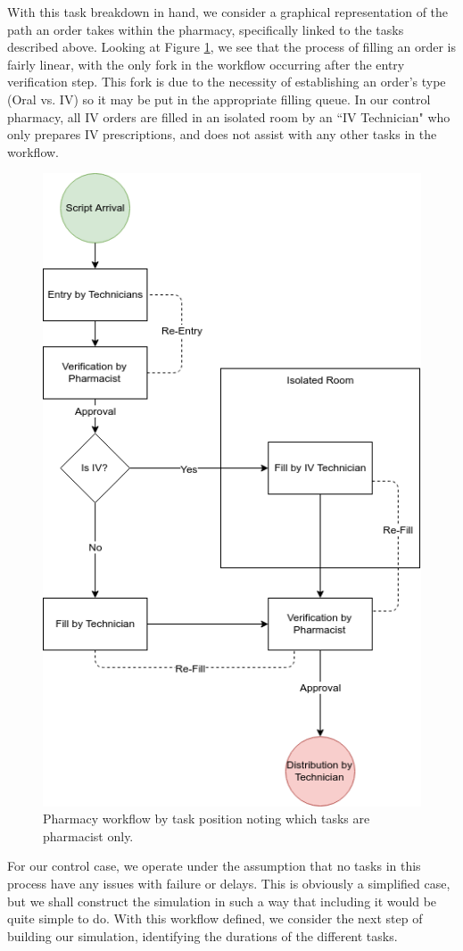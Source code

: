 \documentclass[10pt]{report}            %
\begin{document}
With this task breakdown in hand, we consider a graphical representation of the path an order takes within the pharmacy, specifically linked to the tasks described above. Looking at Figure \ref{fig:flowchart}, we see that the process of filling an order is fairly linear, with the only fork in the workflow occurring after the entry verification step. This fork is due to the necessity of establishing an order's type (Oral vs. IV) so it may be put in the appropriate filling queue. In our control pharmacy, all IV orders are filled in an isolated room by an ``IV Technician" who only prepares IV prescriptions, and does not assist with any other tasks in the workflow. 
\begin{figure}[H]
\centering
\includegraphics[scale=.5]{Flowchart.png}
\caption{Pharmacy workflow by task position noting which tasks are pharmacist only.}
\label{fig:flowchart}
\end{figure}
For our control case, we operate under the assumption that no tasks in this process have any issues with failure or delays. This is obviously a simplified case, but we shall construct the simulation in such a way that including it would be quite simple to do.  With this workflow defined, we consider the next step of building our simulation, identifying the durations of the different tasks.
\end{document}
